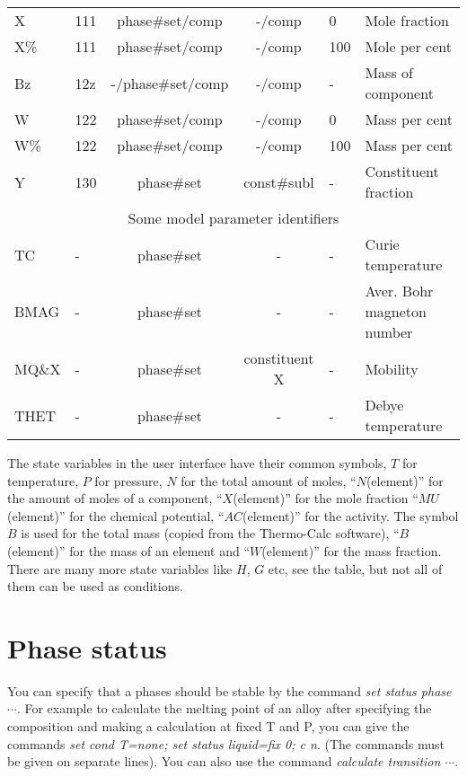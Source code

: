 \documentclass[12pt]{article}
\begin{document}
\begin{table}[!h]
\begin{tabular}{|llccll|}
X      & 111 & phase\#set/comp & -/comp & 0  & Mole fraction\\
X\%    & 111 & phase\#set/comp & -/comp & 100 & Mole per cent\\
Bz     & 12z & -/phase\#set/comp & -/comp & -  & Mass of component\\
W      & 122 & phase\#set/comp & -/comp & 0 & Mass per cent\\
W\%    & 122 & phase\#set/comp & -/comp & 100 & Mass per cent\\
Y      & 130 & phase\#set & const\#subl & -& Constituent fraction\\\hline
\multicolumn{6}{|c|}{Some model parameter identifiers}\\\hline
TC     & - & phase\#set & - & - & Curie temperature\\
BMAG   & - & phase\#set & - & - & Aver. Bohr magneton number\\
MQ\&X  & - & phase\#set & constituent X & - & Mobility\\
THET   & - & phase\#set & - & - & Debye temperature\\\hline
\end{tabular}
\end{table}

The state variables in the user interface have their common symbols,
$T$ for temperature, $P$ for pressure, $N$ for the total amount of
moles, ``$N$(element)'' for the amount of moles of a component,
``$X$(element)'' for the mole fraction ``$MU$(element)'' for the
chemical potential, ``$AC$(element)'' for the activity.  The symbol
$B$ is used for the total mass (copied from the Thermo-Calc software),
``$B$(element)'' for the mass of an element and ``$W$(element)'' for
the mass fraction.  There are many more state variables like $H$, $G$
etc, see the table, but not all of them can be used as conditions.

\section{Phase status}

You can specify that a phases should be stable by the command {\em set
  status phase $\cdots$}.  For example to calculate the melting point
of an alloy after specifying the composition and making a calculation
at fixed T and P, you can give the commands {\em set cond T=none; set
  status liquid=fix 0; c n}.  (The commands must be given on separate
lines).  You can also use the command {\em calculate transition
  $\cdots$}.
\end{document}
